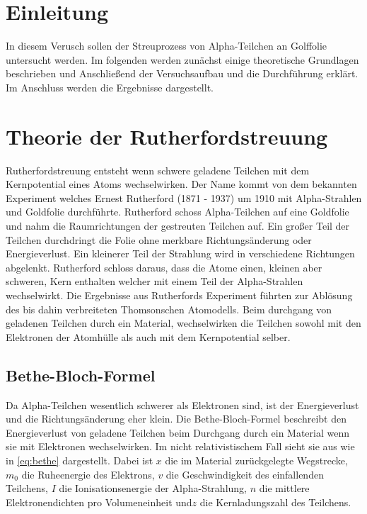 \section{Einleitung}
\label{sec:einleitung}
In diesem Verusch sollen der Streuprozess von Alpha-Teilchen an Golffolie untersucht werden. Im folgenden werden zunächst einige theoretische
Grundlagen beschrieben und Anschließend der Versuchsaufbau und die Durchführung erklärt. Im Anschluss werden die Ergebnisse dargestellt.



\section{Theorie der Rutherfordstreuung}
\label{sec:theorie}

Rutherfordstreuung entsteht wenn schwere geladene Teilchen mit dem Kernpotential eines Atoms wechselwirken.
Der Name kommt von dem bekannten Experiment welches Ernest Rutherford (1871 - 1937)  um
1910 mit Alpha-Strahlen und Goldfolie durchführte. Rutherford schoss Alpha-Teilchen auf eine Goldfolie
und nahm die Raumrichtungen der gestreuten Teilchen auf. Ein großer Teil der Teilchen durchdringt
die Folie ohne merkbare Richtungsänderung oder Energieverlust. Ein kleinerer Teil der Strahlung wird
in verschiedene Richtungen abgelenkt. Rutherford schloss daraus, dass die Atome einen, kleinen
aber schweren, Kern enthalten welcher mit einem Teil der Alpha-Strahlen wechselwirkt.
Die Ergebnisse aus Rutherfords Experiment führten zur Ablösung des bis dahin verbreiteten
Thomsonschen Atomodells.
Beim durchgang von geladenen Teilchen durch ein Material, wechselwirken die Teilchen sowohl mit den
Elektronen der Atomhülle als auch mit dem Kernpotential selber.

\subsection{Bethe-Bloch-Formel}
\label{sub:bethe}

Da Alpha-Teilchen wesentlich schwerer als Elektronen sind,
ist der Energieverlust und die Richtungsänderung eher klein.
Die Bethe-Bloch-Formel beschreibt den Energieverlust von geladene Teilchen beim Durchgang durch ein
Material wenn sie mit Elektronen wechselwirken.
Im nicht relativistischem Fall sieht sie aus wie in \eqref{eq:bethe} dargestellt.
Dabei ist $x$ die im Material zurückgelegte Wegstrecke, $m_0$ die Ruheenergie des Elektrons,
$v$ die Geschwindigkeit des einfallenden Teilchens, $I$ die Ionisationsenergie der Alpha-Strahlung,
$n$ die mittlere Elektronendichten pro Volumeneinheit und$z$ die Kernladungszahl des Teilchens.

